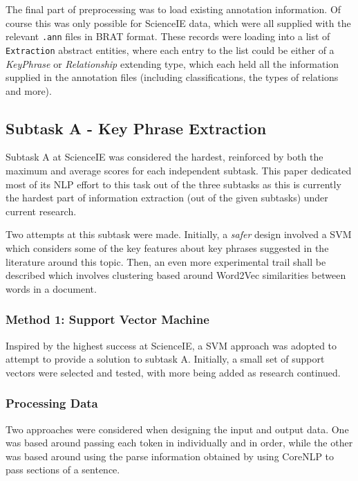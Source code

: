 The final part of preprocessing was to load existing annotation information. Of course this was only possible for ScienceIE data, which were all supplied with the relevant \texttt{.ann} files in BRAT format. These records were loading into a list of \texttt{Extraction} abstract entities, where each entry to the list could be either of a \textit{KeyPhrase} or \textit{Relationship} extending type, which each held all the information supplied in the annotation files (including classifications, the types of relations and more).

\subsection{Subtask A - Key Phrase Extraction}
Subtask A at ScienceIE was considered the hardest, reinforced by both the maximum and average scores for each independent subtask. This paper dedicated most of its NLP effort to this task out of the three subtasks as this is currently the hardest part of information extraction (out of the given subtasks) under current research. 

Two attempts at this subtask were made. Initially, a \textit{safer} design involved a SVM which considers some of the key features about key phrases suggested in the literature around this topic. Then, an even more experimental trail shall be described which involves clustering based around Word2Vec similarities between words in a document. 

\subsubsection{Method 1: Support Vector Machine}
Inspired by the highest success at ScienceIE, a SVM approach was adopted to attempt to provide a solution to subtask A. Initially, a small set of support vectors were selected and tested, with more being added as research continued.

\subsubsection*{Processing Data}
Two approaches were considered when designing the input and output data. One was based around passing each token in individually and in order, while the other was based around using the parse information obtained by using CoreNLP to pass sections of a sentence. 

